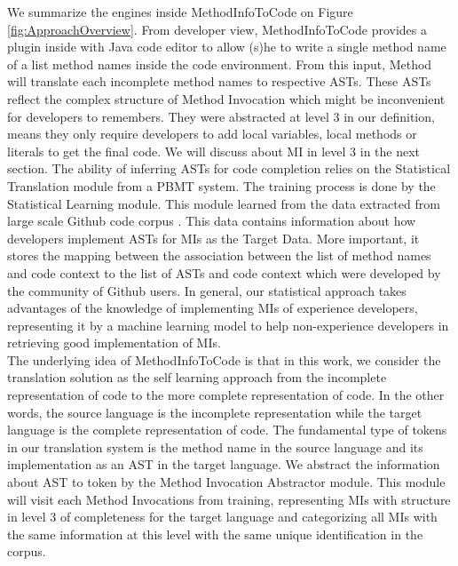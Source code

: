 We summarize the engines inside MethodInfoToCode on Figure \ref{fig:ApproachOverview}. From developer view, MethodInfoToCode provides a plugin inside with Java code editor to allow (s)he to write a single method name of a list method names inside the code environment. From this input, Method will translate each incomplete method names to respective ASTs. These ASTs reflect the complex structure of Method Invocation which might be inconvenient for developers to remembers. They were abstracted at level 3 in our definition, means they only require developers to add local variables, local methods or literals to get the final code. We will discuss about MI in level 3 in the next section. The ability of inferring ASTs for code completion relies on the Statistical Translation module from a PBMT system. The training process is done by the Statistical Learning module. This module learned from the data extracted from large scale Github code corpus  \cite{id:Github}. This data contains information about how developers implement ASTs for MIs as the Target Data. More important, it stores the mapping between the association between the list of method names and code context to the list of ASTs and code context which were developed by the community of Github users. In general, our statistical approach takes advantages of the knowledge of implementing MIs of experience developers, representing it by a machine learning model to help non-experience developers in retrieving good implementation of MIs.
\\
The underlying idea of MethodInfoToCode is that in this work, we consider the translation solution as the self learning approach from the incomplete representation of code to the more complete representation of code. In the other words, the source language is the incomplete representation while the target language is the complete representation of code. The fundamental type of tokens in our translation system is the method name in the source language and its implementation as an AST in the target language. We abstract the information about AST to token by the Method Invocation Abstractor module. This module will visit each Method Invocations from training, representing MIs with structure in level 3 of completeness for the target language and categorizing all MIs with the same information at this level with the same unique identification in the corpus.
\\
